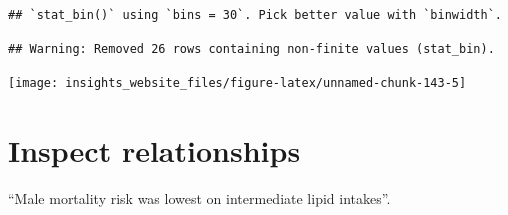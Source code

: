 \documentclass[]{book}
\newenvironment{Shaded}{\begin{snugshade}}{\end{snugshade}}
\newcommand{\DataTypeTok}[1]{\textcolor[rgb]{0.13,0.29,0.53}{#1}}
\newcommand{\DecValTok}[1]{\textcolor[rgb]{0.00,0.00,0.81}{#1}}
\newcommand{\FloatTok}[1]{\textcolor[rgb]{0.00,0.00,0.81}{#1}}
\newcommand{\KeywordTok}[1]{\textcolor[rgb]{0.13,0.29,0.53}{\textbf{#1}}}
\newcommand{\NormalTok}[1]{#1}
\newcommand{\OperatorTok}[1]{\textcolor[rgb]{0.81,0.36,0.00}{\textbf{#1}}}
\newcommand{\StringTok}[1]{\textcolor[rgb]{0.31,0.60,0.02}{#1}}
\begin{document}
\begin{verbatim}
## `stat_bin()` using `bins = 30`. Pick better value with `binwidth`.
\end{verbatim}

\begin{verbatim}
## Warning: Removed 26 rows containing non-finite values (stat_bin).
\end{verbatim}

\begin{center}\texttt{[image: insights\_website\_files/figure-latex/unnamed-chunk-143-5]} \end{center}

\begin{Shaded}
\end{Shaded}

\hypertarget{inspect-relationships}{%
\section{Inspect relationships}\label{inspect-relationships}}

``Male mortality risk was lowest on intermediate lipid intakes''.

\begin{Shaded}
\end{Shaded}
\end{document}
